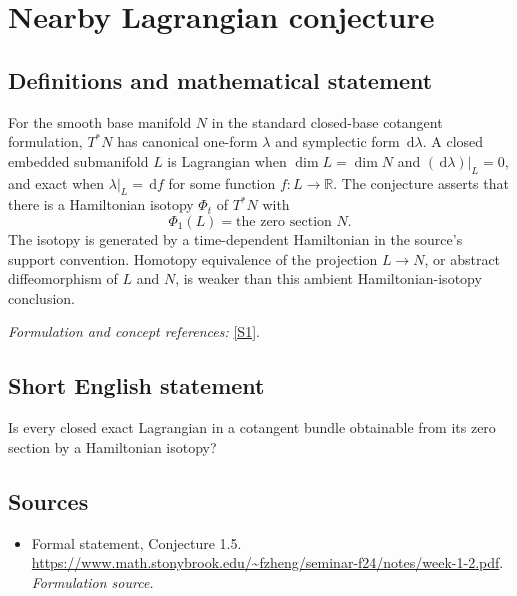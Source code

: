 \documentclass[11pt]{article}
\begin{document}
\section*{\texorpdfstring{Nearby Lagrangian conjecture}{Nearby Lagrangian conjecture}}\label{statement}
\subsection{Definitions and mathematical statement}
For the smooth base manifold $N$ in the standard closed-base cotangent formulation, $T^*N$ has canonical one-form $\lambda$ and symplectic form ${\,\mathrm{d}}\lambda$. A closed embedded submanifold $L$ is Lagrangian when $\dim L=\dim N$ and $({\,\mathrm{d}}\lambda)|_L=0$, and exact when $\lambda|_L={\,\mathrm{d}} f$ for some function $f:L\to{\mathbb{R}}$. The conjecture asserts that there is a Hamiltonian isotopy $\Phi_t$ of $T^*N$ with
\[
 \Phi_1(L)=\text{the zero section }N.
\]
The isotopy is generated by a time-dependent Hamiltonian in the source's support convention. Homotopy equivalence of the projection $L\to N$, or abstract diffeomorphism of $L$ and $N$, is weaker than this ambient Hamiltonian-isotopy conclusion.
\par\smallskip\textit{Formulation and concept references:} \href{https://www.math.stonybrook.edu/~fzheng/seminar-f24/notes/week-1-2.pdf}{[S1]}.

\subsection{Short English statement}
Is every closed exact Lagrangian in a cotangent bundle obtainable from its zero section by a Hamiltonian isotopy?
\subsection{Sources}
\begin{itemize}
\item[S1]Formal statement, Conjecture 1.5.
\url{https://www.math.stonybrook.edu/~fzheng/seminar-f24/notes/week-1-2.pdf}.
\textit{Formulation source.}
\end{itemize}
\end{document}
